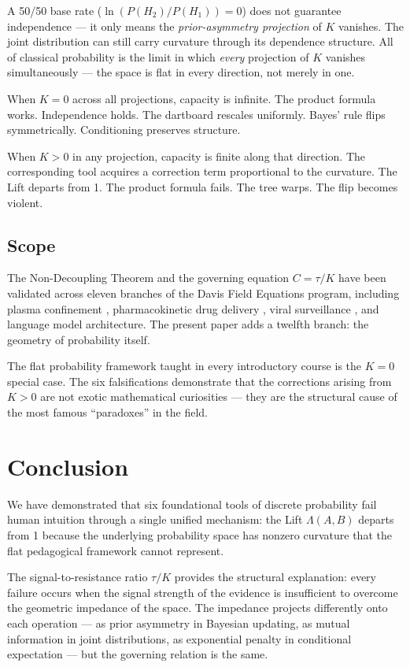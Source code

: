\documentclass[12pt]{article}
\begin{document}
A 50/50 base rate ($\ln(P(H_2)/P(H_1)) = 0$) does not guarantee independence --- it only means the \textit{prior-asymmetry projection} of $K$ vanishes. The joint distribution can still carry curvature through its dependence structure. All of classical probability is the limit in which \textit{every} projection of $K$ vanishes simultaneously --- the space is flat in every direction, not merely in one.

When $K = 0$ across all projections, capacity is infinite. The product formula works. Independence holds. The dartboard rescales uniformly. Bayes' rule flips symmetrically. Conditioning preserves structure.

When $K > 0$ in any projection, capacity is finite along that direction. The corresponding tool acquires a correction term proportional to the curvature. The Lift departs from 1. The product formula fails. The tree warps. The flip becomes violent.

\subsection{Scope}

The Non-Decoupling Theorem and the governing equation $C = \tau/K$ have been validated across eleven branches of the Davis Field Equations program, including plasma confinement \cite{davis2026plasma}, pharmacokinetic drug delivery \cite{davis2026delivery}, viral surveillance \cite{davis2025field}, and language model architecture. The present paper adds a twelfth branch: the geometry of probability itself.

The flat probability framework taught in every introductory course is the $K = 0$ special case. The six falsifications demonstrate that the corrections arising from $K > 0$ are not exotic mathematical curiosities --- they are the structural cause of the most famous ``paradoxes'' in the field.

\section{Conclusion}

We have demonstrated that six foundational tools of discrete probability fail human intuition through a single unified mechanism: the Lift $\Lambda(A,B)$ departs from 1 because the underlying probability space has nonzero curvature that the flat pedagogical framework cannot represent.

The signal-to-resistance ratio $\tau/K$ provides the structural explanation: every failure occurs when the signal strength of the evidence is insufficient to overcome the geometric impedance of the space. The impedance projects differently onto each operation --- as prior asymmetry in Bayesian updating, as mutual information in joint distributions, as exponential penalty in conditional expectation --- but the governing relation is the same.
\end{document}
